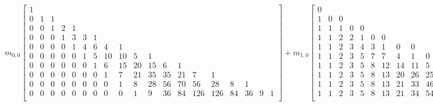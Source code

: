 \begin{sidewaystable}
\begin{equation}
\end{equation}
\begin{equation}
m_{0,0}\left[\begin{array}{ccccccccccccccccccc}
1 &  &  &  &  &  &  &  &  &  &  &  &  &  &  &  &  &  &  \\
0 & 1 & 1 &  &  &  &  &  &  &  &  &  &  &  &  &  &  &  &  \\
0 & 0 & 1 & 2 & 1 &  &  &  &  &  &  &  &  &  &  &  &  &  &  \\
0 & 0 & 0 & 1 & 3 & 3 & 1 &  &  &  &  &  &  &  &  &  &  &  &  \\
0 & 0 & 0 & 0 & 1 & 4 & 6 & 4 & 1 &  &  &  &  &  &  &  &  &  &  \\
0 & 0 & 0 & 0 & 0 & 1 & 5 & 10 & 10 & 5 & 1 &  &  &  &  &  &  &  &  \\
0 & 0 & 0 & 0 & 0 & 0 & 1 & 6 & 15 & 20 & 15 & 6 & 1 &  &  &  &  &  &  \\
0 & 0 & 0 & 0 & 0 & 0 & 0 & 1 & 7 & 21 & 35 & 35 & 21 & 7 & 1 &  &  &  &  \\
0 & 0 & 0 & 0 & 0 & 0 & 0 & 0 & 1 & 8 & 28 & 56 & 70 & 56 & 28 & 8 & 1 &  &  \\
0 & 0 & 0 & 0 & 0 & 0 & 0 & 0 & 0 & 1 & 9 & 36 & 84 & 126 & 126 & 84 & 36 & 9 & 1 \\
\end{array}\right] + m_{1,0}\left[\begin{array}{ccccccccccccccccccc}
0 &  &  &  &  &  &  &  &  &  &  &  &  &  &  &  &  &  &  \\
1 & 0 & 0 &  &  &  &  &  &  &  &  &  &  &  &  &  &  &  &  \\
1 & 1 & 1 & 0 & 0 &  &  &  &  &  &  &  &  &  &  &  &  &  &  \\
1 & 1 & 2 & 2 & 1 & 0 & 0 &  &  &  &  &  &  &  &  &  &  &  &  \\
1 & 1 & 2 & 3 & 4 & 3 & 1 & 0 & 0 &  &  &  &  &  &  &  &  &  &  \\
1 & 1 & 2 & 3 & 5 & 7 & 7 & 4 & 1 & 0 & 0 &  &  &  &  &  &  &  &  \\
1 & 1 & 2 & 3 & 5 & 8 & 12 & 14 & 11 & 5 & 1 & 0 & 0 &  &  &  &  &  &  \\
1 & 1 & 2 & 3 & 5 & 8 & 13 & 20 & 26 & 25 & 16 & 6 & 1 & 0 & 0 &  &  &  &  \\
1 & 1 & 2 & 3 & 5 & 8 & 13 & 21 & 33 & 46 & 51 & 41 & 22 & 7 & 1 & 0 & 0 &  &  \\
1 & 1 & 2 & 3 & 5 & 8 & 13 & 21 & 34 & 54 & 79 & 97 & 92 & 63 & 29 & 8 & 1 & 0 & 0 \\
\end{array}\right]
\label{eq:stretched:pascal:like:two:splitted:matrix:expansion}
\end{equation}
\end{sidewaystable}

